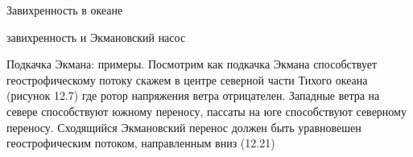 \begin{chapter}{Завихренность в океане}
\begin{section}{завихренность и Экмановский насос}
\begin{paragraph}{Подкачка Экмана: примеры.}
Посмотрим как подкачка Экмана способствует геострофическому потоку
скажем в центре северной части Тихого океана (рисунок 12.7) где ротор
напряжения ветра отрицателен. Западные ветра на севере способствуют
южному переносу, пассаты на юге способствуют северному
переносу. Сходящийся Экмановский перенос должен быть уравновешен
геострофическим потоком, направленным вниз (12.21)
%


\end{paragraph}
\end{section}
\end{chapter}
